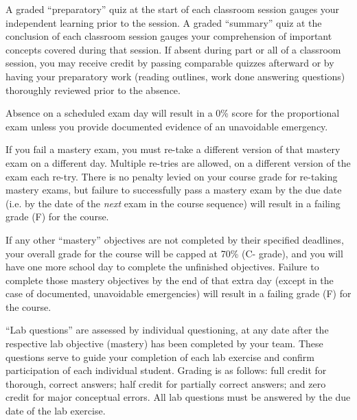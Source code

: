 \vskip 10pt

A graded ``preparatory'' quiz at the start of each classroom session gauges your independent learning prior to the session.  A graded ``summary'' quiz at the conclusion of each classroom session gauges your comprehension of important concepts covered during that session.  If absent during part or all of a classroom session, you may receive credit by passing comparable quizzes afterward or by having your preparatory work (reading outlines, work done answering questions) thoroughly reviewed prior to the absence.  

\vskip 10pt

Absence on a scheduled exam day will result in a 0\% score for the proportional exam unless you provide documented evidence of an unavoidable emergency.  

\vskip 10pt

If you fail a mastery exam, you must re-take a different version of that mastery exam on a different day.  Multiple re-tries are allowed, on a different version of the exam each re-try.  There is no penalty levied on your course grade for re-taking mastery exams, but failure to successfully pass a mastery exam by the due date (i.e. by the date of the {\it next} exam in the course sequence) will result in a failing grade (F) for the course.  

\vskip 10pt

If any other ``mastery'' objectives are not completed by their specified deadlines, your overall grade for the course will be capped at 70\% (C- grade), and you will have one more school day to complete the unfinished objectives.  Failure to complete those mastery objectives by the end of that extra day (except in the case of documented, unavoidable emergencies) will result in a failing grade (F) for the course.

\vskip 10pt

``Lab questions'' are assessed by individual questioning, at any date after the respective lab objective (mastery) has been completed by your team.  These questions serve to guide your completion of each lab exercise and confirm participation of each individual student.  Grading is as follows: full credit for thorough, correct answers; half credit for partially correct answers; and zero credit for major conceptual errors.  All lab questions must be answered by the due date of the lab exercise.

\vskip 10pt

